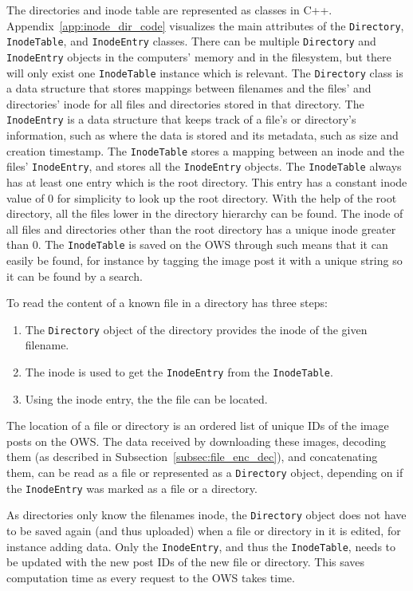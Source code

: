 The directories and inode table are represented as classes in C++. Appendix~\ref{app:inode_dir_code} visualizes the main attributes of the \texttt{Directory}, \texttt{InodeTable}, and \texttt{InodeEntry} classes. There can be multiple \texttt{Directory} and \texttt{InodeEntry} objects in the computers' memory and in the filesystem, but there will only exist one \texttt{InodeTable} instance which is relevant. The \texttt{Directory} class is a data structure that stores mappings between filenames and the files' and directories' inode for all files and directories stored in that directory. The \texttt{InodeEntry} is a data structure that keeps track of a file's or directory's information, such as where the data is stored and its metadata, such as size and creation timestamp. The \texttt{InodeTable} stores a mapping between an inode and the files' \texttt{InodeEntry}, and stores all the \texttt{InodeEntry} objects. The \texttt{InodeTable} always has at least one entry which is the root directory. This entry has a constant inode value of 0 for simplicity to look up the root directory. With the help of the root directory, all the files lower in the directory hierarchy can be found. The inode of all files and directories other than the root directory has a unique inode greater than 0. The \texttt{InodeTable} is saved on the OWS through such means that it can easily be found, for instance by tagging the image post it with a unique string so it can be found by a search.

To read the content of a known file in a directory has three steps:
\begin{enumerate}
	\item The \texttt{Directory} object of the directory provides the inode of the given filename.
	\item The inode is used to get the \texttt{InodeEntry} from the \texttt{InodeTable}.
	\item Using the inode entry, the the file can be located.
\end{enumerate}
The location of a file or directory is an ordered list of unique IDs of the image posts on the OWS. The data received by downloading these images, decoding them (as described in Subsection~\ref{subsec:file_enc_dec}), and concatenating them, can be read as a file or represented as a \texttt{Directory} object, depending on if the \texttt{InodeEntry} was marked as a file or a directory. 

As directories only know the filenames inode, the \texttt{Directory} object does not have to be saved again (and thus uploaded) when a file or directory in it is edited, for instance adding data. Only the \texttt{InodeEntry}, and thus the \texttt{InodeTable}, needs to be updated with the new post IDs of the new file or directory. This saves computation time as every request to the OWS takes time.

